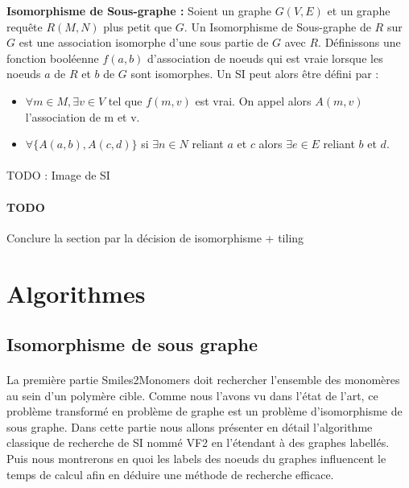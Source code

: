 \documentclass[12pt,french,twoside]{report}
\begin{document}
\begin{definition}\textbf{Isomorphisme de Sous-graphe :}
 Soient un graphe $G(V, E)$ et un graphe requête $R(M, N)$ plus petit que $G$. Un Isomorphisme de Sous-graphe de $R$ sur $G$ est
 une association isomorphe d'une sous partie de $G$ avec $R$. Définissons une fonction booléenne $f(a, b)$ d'association
 de noeuds qui est vraie lorsque les noeuds $a$ de $R$ et $b$ de $G$ sont isomorphes. Un SI peut alors être défini par :
 \begin{itemize}
  \item $\forall m \in M, \exists v \in V$ tel que $f(m, v)$ est vrai. On appel alors $A(m, v)$ l'association de m et v.
  \item $\forall \{A(a, b) , A(c, d)\}$ si $\exists n \in N$ reliant $a$ et $c$ alors $\exists e \in E$ reliant $b$ et $d$.
 \end{itemize}
\end{definition}


\paragraph{}TODO : Image de SI


\paragraph{TODO}Conclure la section par la décision de isomorphisme + tiling

\section{Algorithmes}

\subsection{Isomorphisme de sous graphe}

\label{isomorphisme_p}

\paragraph{}La première partie Smiles2Monomers doit rechercher l'ensemble des monomères au sein d'un polymère cible.
Comme nous l'avons vu dans l'état de l'art, ce problème transformé en problème de graphe est un problème d'isomorphisme de sous graphe.
Dans cette partie nous allons présenter en détail l'algorithme classique de recherche de SI nommé VF2 en l'étendant à des graphes labellés.
Puis nous montrerons en quoi les labels des noeuds du graphes influencent le temps de calcul afin en déduire une méthode de recherche efficace.
\end{document}
